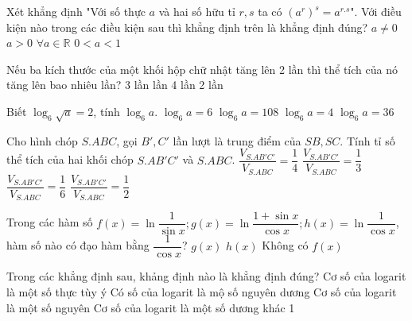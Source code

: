 \begin{ex}%
Xét khẳng định "Với số thực $a$ và hai số hữu tỉ $r, s$ ta có $(a^r)^s=a^{r.s}$". Với điều kiện nào trong các điều kiện sau thì khẳng định trên là khẳng định đúng?
\choice
{$a\ne 0$}
{\True $a>0$}
{$\forall a\in \mathbb{R}$}
{$0<a<1$}
\end{ex}

\begin{ex}%
Nếu ba kích thước của một khối hộp chữ nhật tăng lên 2 lần thì thể tích của nó tăng lên bao nhiêu lần?
\choice
{3 lần}
{ lần}
{4 lần}
{2 lần}
\end{ex}

\begin{ex}%
Biết $\log_6\sqrt{a}=2$, tính $\log_6 a$.
\choice
{$\log_6 a= 6$}
{$\log_6 a =108$}
{\True $\log_6 a=4$}
{$\log_6 a=36$}
\end{ex}

\begin{ex}%
Cho hình chóp $S.ABC$, gọi $B', C'$ lần lượt là trung điểm của $SB, SC$. Tính tỉ số thể tích của hai khối chóp $S.AB'C'$ và $S.ABC$.
\choice
{\True $\dfrac{V_{S.AB'C'}}{V_{S.ABC}} =\dfrac{1}{4}$}
{$\dfrac{V_{S.AB'C'}}{V_{S.ABC}} =\dfrac{1}{3}$}
{$\dfrac{V_{S.AB'C'}}{V_{S.ABC}} =\dfrac{1}{6}$}
{$\dfrac{V_{S.AB'C'}}{V_{S.ABC}} =\dfrac{1}{2}$}
\end{ex}

\begin{ex}%
Trong các hàm số $f(x)=\ln\dfrac{1}{\sin x}; g(x)=\ln\dfrac{1+\sin x}{\cos x}; h(x)=\ln\dfrac{1}{\cos x}$, hàm số nào có đạo hàm bằng $\dfrac{1}{\cos x}$?
\choice
{\True $g(x)$}
{$h(x)$}
{Không có}
{$f(x)$}
\end{ex}

\begin{ex}%
Trong các khẳng định sau, khảng định nào là khẳng định đúng?
\choice
{Cơ số của logarit là một số thực tùy ý}
{Có số của logarit là mộ số nguyên dương}
{Cơ số của logarit là một số nguyên}
{\True Cơ số của logarit là một số dương khác 1}
\end{ex}

